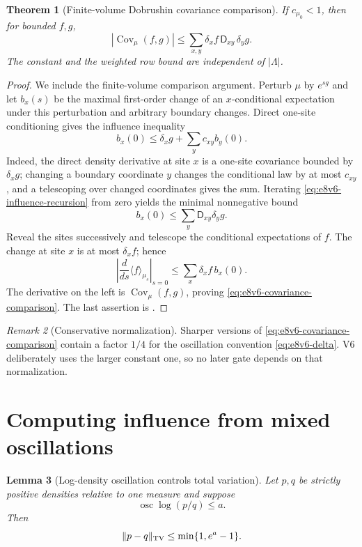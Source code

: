 \documentclass[11pt,oneside]{book}
\newtheorem{theorem}{Theorem}[chapter]
\newtheorem{lemma}[theorem]{Lemma}
\theoremstyle{definition}
\theoremstyle{remark}
\newtheorem{remark}[theorem]{Remark}
\begin{document}
\begin{theorem}[Finite-volume Dobrushin covariance comparison]
\label{thm:e8v6-Dobrushin-covariance}
If \(c_{\mu_0}<1\), then for bounded \(f,g\),
\[
 |\operatorname{Cov}_{\mu}(f,g)|
 \le
 \sum_{x,y}\delta_xf\,{\mathsf D}_{xy}\,\delta_yg.    \label{eq:e8v6-covariance-comparison}
\]
The constant and the weighted row bound are independent of
\(|\Lambda|\).
\end{theorem}

\begin{proof}
We include the finite-volume comparison argument.  Perturb \(\mu\) by
\(e^{sg}\) and let \(b_x(s)\) be the maximal first-order change of an
\(x\)-conditional expectation under this perturbation and arbitrary
boundary changes.  Direct one-site conditioning gives the influence
inequality
\[
 b_x(0)\le\delta_xg+\sum_yc_{xy}b_y(0).              \label{eq:e8v6-influence-recursion}
\]
Indeed, the direct density derivative at site \(x\) is a one-site
covariance bounded by \(\delta_xg\); changing a boundary coordinate
\(y\) changes the conditional law by at most \(c_{xy}\), and a
telescoping over changed coordinates gives the sum.  Iterating
\eqref{eq:e8v6-influence-recursion} from zero yields the minimal
nonnegative bound
\[
 b_x(0)\le\sum_y{\mathsf D}_{xy}\delta_yg.
\]
Reveal the sites successively and telescope the conditional
expectations of \(f\).  The change at site \(x\) is at most
\(\delta_xf\); hence
\[
 \left|\frac d{ds}\langle f\rangle_{\mu_s}\right|_{s=0}
 \le\sum_x\delta_xf\,b_x(0).
\]
The derivative on the left is
\(\operatorname{Cov}_\mu(f,g)\), proving
\eqref{eq:e8v6-covariance-comparison}.  The last assertion is
.
\end{proof}

\begin{remark}[Conservative normalization]
\label{rem:e8v6-constant}
Sharper versions of \eqref{eq:e8v6-covariance-comparison} contain a
factor \(1/4\) for the oscillation convention
\eqref{eq:e8v6-delta}.  V6 deliberately uses the larger constant
one, so no later gate depends on that normalization.
\end{remark}

\section{Computing influence from mixed oscillations}
\label{sec:e8v6-mixed}

\begin{lemma}[Log-density oscillation controls total variation]
\label{lem:e8v6-log-TV}
Let \(p,q\) be strictly positive densities relative to one measure and
suppose
\[
 \operatorname{osc}\log(p/q)\le a.                  \label{eq:e8v6-logosc}
\]
Then
\[
 \|p-q\|_{\rm TV}\le\min\{1,e^a-1\}.                \label{eq:e8v6-TV}
\]
\end{lemma}
\end{document}
